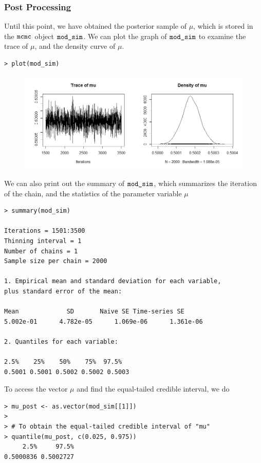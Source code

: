\documentclass{article}
\begin{document}
\subsubsection*{Post Processing}

Until this point, we have obtained the posterior sample of $\mu$, which is stored in the $\verb|mcmc|$ object $\verb|mod_sim|$. We can plot the graph of $\verb|mod_sim|$ to examine the trace of $\mu$, and the density curve of $\mu$. 

\begin{lstlisting}
> plot(mod_sim)
\end{lstlisting}

\begin{figure}[tbph]
	\centering
	\includegraphics[width=0.7\linewidth]{Week3_MCMCRplot}
	\label{fig:week3mcmcrplot}
\end{figure}

We can also print out the summary of $\verb|mod_sim|$, which summarizes the iteration of the chain, and the statistics of the parameter variable $\mu$

\begin{lstlisting}
> summary(mod_sim)

Iterations = 1501:3500
Thinning interval = 1 
Number of chains = 1 
Sample size per chain = 2000 

1. Empirical mean and standard deviation for each variable,
plus standard error of the mean:

Mean             SD       Naive SE Time-series SE 
5.002e-01      4.782e-05      1.069e-06      1.361e-06 

2. Quantiles for each variable:

2.5%    25%    50%    75%  97.5% 
0.5001 0.5001 0.5002 0.5002 0.5003 
\end{lstlisting}

To access the vector $\mu$ and find the equal-tailed credible interval, we do
\begin{lstlisting}
> mu_post <- as.vector(mod_sim[[1]])
>
> # To obtain the equal-tailed credible interval of "mu"
> quantile(mu_post, c(0.025, 0.975))
     2.5%     97.5% 
0.5000836 0.5002727
\end{lstlisting}
\end{document}
